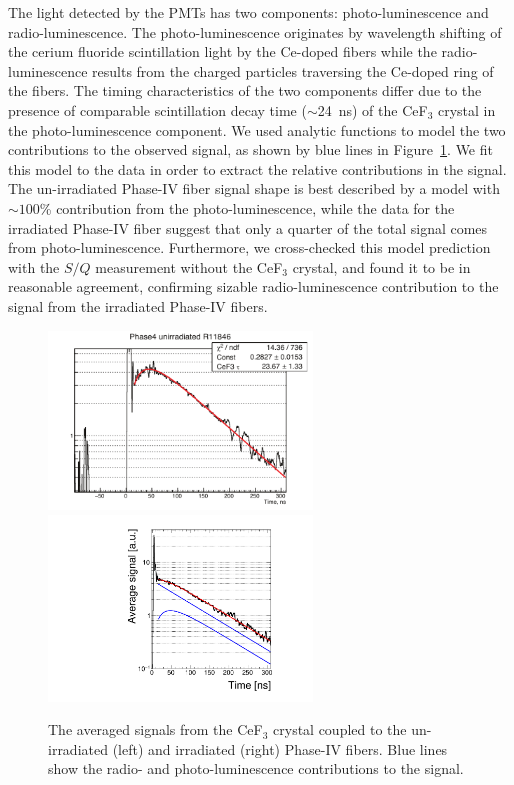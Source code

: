 \documentclass[a4paper,11pt]{article}
\begin{document}
The light detected by the PMTs has two components: photo-luminescence and radio-luminescence. The photo-luminescence originates by  wavelength shifting of the cerium fluoride scintillation light by the Ce-doped fibers while the radio-luminescence results from the charged particles traversing the Ce-doped ring of the fibers. The timing characteristics of the two components differ due to the presence of comparable scintillation decay time ($\sim$24~ns) of the CeF$_3$ crystal in the photo-luminescence component. We used analytic functions to model the two contributions to the observed signal, as shown by blue lines in Figure~\ref{fig:CeF3signals}. We fit this model to the data in order to extract the relative contributions in the signal. The un-irradiated Phase-IV fiber signal shape is best described by a model with $\sim100$\% contribution from the photo-luminescence, while the data for the irradiated Phase-IV fiber suggest that only a quarter of the total signal comes from  photo-luminescence. Furthermore, we cross-checked this model prediction with the $S/Q$ measurement without the CeF$_3$ crystal, and found it to be in reasonable agreement, confirming sizable radio-luminescence contribution to the signal from the irradiated Phase-IV fibers. 
\begin{figure}[ht]
\begin{center}
        \includegraphics[width=7cm]{Figures/CeF3coupledFibersUnirrad.pdf}
        \includegraphics[width=7cm]{Figures/CeF3coupledFibersIrrad.pdf}
    \caption{\small The averaged signals from the CeF$_3$ crystal coupled to the  un-irradiated (left) and irradiated (right) Phase-IV fibers. Blue lines show the radio- and photo-luminescence contributions to the signal. }
    \label{fig:CeF3signals}
\end{center}
\end{figure}
\end{document}
